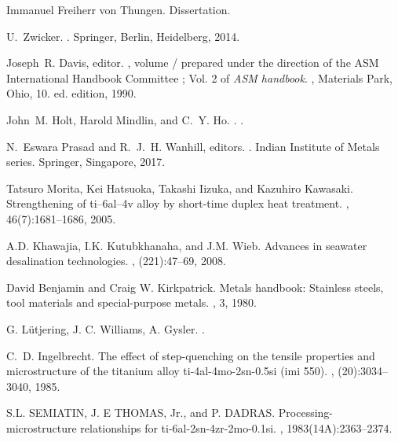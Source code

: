 \begin{thebibliography}{10}
{Immanuel Freiherr von Thungen}.
\newblock Dissertation.

U.~Zwicker.
.
\newblock Springer, Berlin, Heidelberg, 2014.

Joseph~R. Davis, editor.
, volume / prepared under the direction of the ASM International
  Handbook Committee ; Vol. 2 of {\em ASM handbook}.
, Materials Park, Ohio, 10. ed. edition, 1990.

John~M. Holt, Harold Mindlin, and C.~Y. Ho.
.
.

N.~Eswara Prasad and R.~J.~H. Wanhill, editors.
.
\newblock Indian Institute of Metals series. Springer, Singapore, 2017.

Tatsuro Morita, Kei Hatsuoka, Takashi Iizuka, and Kazuhiro Kawasaki.
\newblock Strengthening of ti--6al--4v alloy by short-time duplex heat
  treatment.
, 46(7):1681--1686, 2005.

{A.D. Khawajia}, {I.K. Kutubkhanaha}, and {J.M. Wieb}.
\newblock Advances in seawater desalination technologies.
, (221):47--69, 2008.

{David Benjamin} and {Craig W. Kirkpatrick}.
\newblock Metals handbook: Stainless steels, tool materials and special-purpose
  metals.
, 3, 1980.

{G. L{\"u}tjering, J. C. Williams, A. Gysler}.
.

C.~D. Ingelbrecht.
\newblock The effect of step-quenching on the tensile properties and
  microstructure of the titanium alloy ti-4al-4mo-2sn-0.5si (imi 550).
, (20):3034--3040, 1985.

{S.L. SEMIATIN, J. E THOMAS, Jr., and P. DADRAS}.
\newblock Processing-microstructure relationships for ti-6al-2sn-4zr-2mo-0.1si.
, 1983(14A):2363--2374.


\end{thebibliography}
